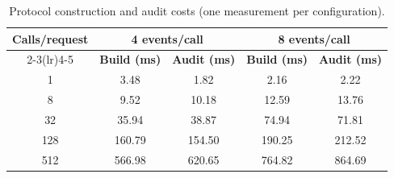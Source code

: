 \begin{table}[!t]
\centering
\caption{Protocol construction and audit costs (one measurement per configuration).}
\label{tab:b3-protocol-scaling}
\footnotesize
\renewcommand{\arraystretch}{1.10}
\begin{tabular*}{\textwidth}{@{\hspace{4pt}}c@{\extracolsep{\fill}}cccc@{\hspace{4pt}}}
\toprule
\textbf{Calls/request} & \multicolumn{2}{c}{\textbf{4 events/call}} & \multicolumn{2}{c}{\textbf{8 events/call}} \\
\cmidrule(lr){2-3}\cmidrule(lr){4-5}
 & \textbf{Build (ms)} & \textbf{Audit (ms)} & \textbf{Build (ms)} & \textbf{Audit (ms)} \\
\midrule
1 & 3.48 & 1.82 & 2.16 & 2.22 \\
8 & 9.52 & 10.18 & 12.59 & 13.76 \\
32 & 35.94 & 38.87 & 74.94 & 71.81 \\
128 & 160.79 & 154.50 & 190.25 & 212.52 \\
512 & 566.98 & 620.65 & 764.82 & 864.69 \\
\bottomrule
\end{tabular*}
\end{table}
